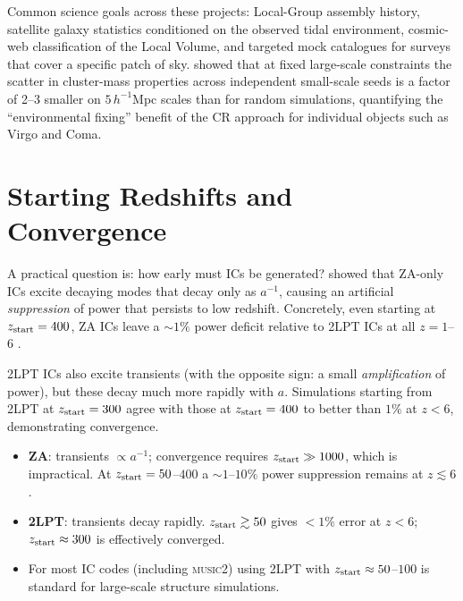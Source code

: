 \documentclass[12pt]{article}
\begin{document}
Common science goals across these projects: Local-Group assembly
history, satellite galaxy statistics conditioned on the observed
tidal environment, cosmic-web classification of the Local Volume, and
targeted mock catalogues for surveys that cover a specific patch of
sky.  \citet{Sorce2016b} showed that at fixed large-scale constraints
the scatter in cluster-mass properties across independent small-scale
seeds is a factor of 2--3 smaller on $5\,h^{-1}$Mpc scales than for
random simulations, quantifying the ``environmental fixing'' benefit
of the CR approach for individual objects such as Virgo and Coma.

\section{Starting Redshifts and Convergence}
\label{sec:zstart}

A practical question is: how early must ICs be generated?
\citet{Crocce2006} showed that ZA-only ICs excite decaying modes
that decay only as $a^{-1}$, causing an artificial \emph{suppression}
of power that persists to low redshift.  Concretely, even starting at
$z_{\rm start}=400$, ZA ICs leave a $\sim\!1\%$ power deficit relative
to 2LPT ICs at all $z=1$--6 \citep{Jeong2010}.

2LPT ICs also excite transients (with the opposite sign: a small
\emph{amplification} of power), but these decay much more rapidly
with $a$.  Simulations starting from 2LPT at $z_{\rm start}=300$
agree with those at $z_{\rm start}=400$ to better than $1\%$ at
$z<6$, demonstrating convergence.

\medskip
\begin{itemize}
  \item \textbf{ZA}: transients $\propto a^{-1}$; convergence
    requires $z_{\rm start} \gg 1000$, which is impractical.
    At $z_{\rm start}=50$--$400$ a $\sim\!1$--$10\%$ power
    suppression remains at $z \lesssim 6$.
  \item \textbf{2LPT}: transients decay rapidly.
    $z_{\rm start} \gtrsim 50$ gives $<1\%$ error at $z<6$;
    $z_{\rm start} \approx 300$ is effectively converged.
  \item For most IC codes (including \textsc{music2}) using 2LPT
    with $z_{\rm start} \approx 50$--$100$ is standard for
    large-scale structure simulations.
\end{itemize}
\end{document}
